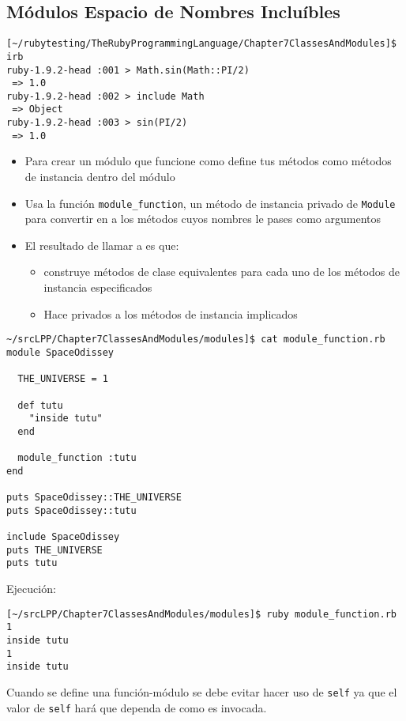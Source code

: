 \subsection{Módulos Espacio de Nombres Incluíbles}
\label{subsection:modulosespaciodenombresincluibles}
\begin{verbatim}
[~/rubytesting/TheRubyProgrammingLanguage/Chapter7ClassesAndModules]$ irb
ruby-1.9.2-head :001 > Math.sin(Math::PI/2)
 => 1.0 
ruby-1.9.2-head :002 > include Math
 => Object 
ruby-1.9.2-head :003 > sin(PI/2)
 => 1.0 
\end{verbatim}
\begin{itemize}
\item
Para crear un módulo que funcione como  define
tus métodos como métodos de instancia dentro del módulo
\item Usa la función \verb|module_function|, un método de instancia privado
de \verb|Module| para convertir en  a los métodos
cuyos nombres le pases como argumentos
\item
El resultado de llamar a  es que: 
\begin{itemize}
\item
construye métodos
de clase equivalentes para cada uno de los métodos de instancia especificados
\item
Hace privados a los métodos de instancia implicados
\end{itemize}
\end{itemize}

\begin{verbatim}
~/srcLPP/Chapter7ClassesAndModules/modules]$ cat module_function.rb 
module SpaceOdissey

  THE_UNIVERSE = 1

  def tutu
    "inside tutu"
  end

  module_function :tutu
end

puts SpaceOdissey::THE_UNIVERSE
puts SpaceOdissey::tutu

include SpaceOdissey
puts THE_UNIVERSE
puts tutu
\end{verbatim}
Ejecución:
\begin{verbatim}
[~/srcLPP/Chapter7ClassesAndModules/modules]$ ruby module_function.rb 
1
inside tutu
1
inside tutu

\end{verbatim}
Cuando se define una función-módulo se debe evitar hacer uso de \verb|self|
ya que el valor de \verb|self| hará que dependa de como es invocada.


